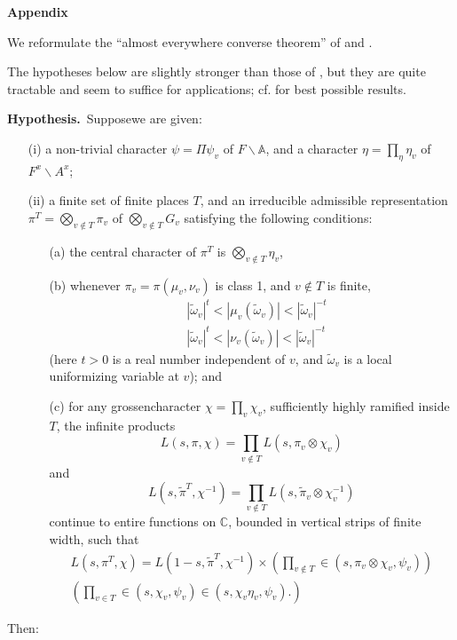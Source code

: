 \medskip
\noindent
{\bf Appendix}
\smallskip

We reformulate the ``almost everywhere converse theorem'' of \cite{Jacquet-Langlands} and \cite{Weil 2}.

The hypotheses below are slightly stronger than those of \cite{Jacquet-Langlands}, but they are quite tractable and seem to suffice for applications; cf. \cite{PS 2} for best possible results.

\medskip
\noindent
{\bf Hypothesis.}~Suppose\pageoriginale we are given:
\begin{itemize}
\item[(i)] a non-trivial character $\psi=\Pi\psi_{v}$ of $F\backslash \mathbb{A}$, and a character $\eta=\prod\limits_{\eta}\eta_{v}$ of $F^{x}\backslash A^{x}$;

\item[(ii)] a finite set of finite places $T$, and an irreducible admissible representation $\pi^{T}=\bigotimes\limits_{v\not\in T}\pi_{v}$ of $\bigotimes\limits_{v\not\in T}G_{v}$ satisfying the following conditions:
\begin{itemize}
\item[(a)] the central character of $\pi^{T}$ is $\bigotimes\limits_{v\not\in T}\eta_{v}$,

\item[(b)] whenever $\pi_{v}=\pi(\mu_{v},\nu_{v})$ is class 1, and $v\not\in T$ is finite,
\begin{align*}
& |\widetilde{\omega}_{v}|^{t}<|\mu_{v}(\widetilde{\omega}_{v})|<|\widetilde{\omega}_{v}|^{-t}\\[4pt]
& |\widetilde{\omega}_{v}|^{t}<|\nu_{v}(\widetilde{\omega}_{v})|<|\widetilde{\omega}_{v}|^{-t}
\end{align*}
(here $t>0$ is a real number independent of $v$, and $\widetilde{\omega}_{v}$ is a local uniformizing variable at $v$); and

\item[(c)] for any grossencharacter $\chi=\prod\limits_{v}\chi_{v}$, sufficiently highly ramified inside $T$, the infinite products
$$
L(s,\pi,\chi)=\prod\limits_{v\not\in T}L(s,\pi_{v}\otimes \chi_{v})
$$
and
$$
L(s,\widetilde{\pi}^{T},\chi^{-1})=\prod\limits_{v\not\in T}L(s,\widetilde{\pi}_{v}\otimes \chi^{-1}_{v})
$$
continue to entire functions on $\mathbb{C}$, bounded in vertical strips of finite width, such that
\begin{gather*}
L(s,\pi^{T},\chi)=L(1-s,\widetilde{\pi}^{T},\chi^{-1})\times\left(\prod\limits_{v\not\in T}\in (s,\pi_{v}\otimes \chi_{v},\psi_{v})\right)\\
\left(\prod\limits_{v\in T}\in (s,\chi_{v},\psi_{v})\in (s,\chi_{v}\eta_{v},\psi_{v}).\right)
\end{gather*}
\end{itemize}
\end{itemize}
Then:

